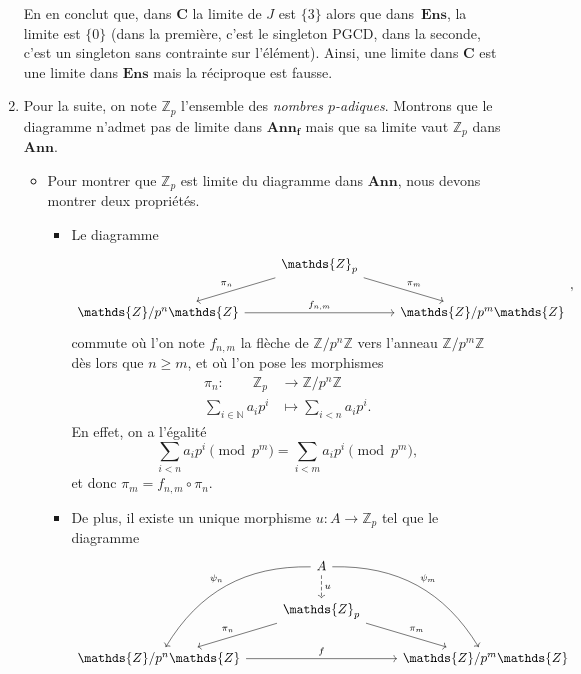 \documentclass{../../td}
\begin{document}
\begin{enumerate}
      En en conclut que, dans $\mathbf{C}$ la limite de $J$ est $\{3\} $ alors que dans~$\mathbf{Ens}$, la limite est $\{0\}$ (dans la première, c'est le singleton PGCD, dans la seconde, c'est un singleton sans contrainte sur l'élément).
      Ainsi, une limite dans $\mathbf{C}$ est une limite dans $\mathbf{Ens}$ mais la réciproque est fausse.
    \item Pour la suite, on note $\mathds{Z}_p$ l'ensemble des \textit{nombres $p$-adiques}.
      Montrons que le diagramme n'admet pas de limite dans $\mathbf{Ann_f}$ mais que sa limite vaut $\mathds{Z}_p$ dans $\mathbf{Ann}$.
      \begin{itemize}
        \item Pour montrer que $\mathds{Z}_p$ est limite du diagramme dans $\mathbf{Ann}$, nous devons montrer deux propriétés.
          \begin{itemize}
            \item Le diagramme \[
                \begin{tikzcd}
                  & \mathds{Z}_p \arrow{dr}{\pi_m} \arrow[swap]{dl}{\pi_n}\\
                  \mathds{Z}/p^n\mathds{Z} \arrow{rr}{f_{n,m}} && \mathds{Z}/p^m\mathds{Z}
                \end{tikzcd}
              ,\]
              commute où l'on note $f_{n,m}$ la flèche de $\mathds{Z} / p^n \mathds{Z}$ vers l'anneau $\mathds{Z} / p^m \mathds{Z}$ dès lors que $n \ge m$, et où l'on pose les morphismes
              \begin{align*}
                \pi_n: \quad\quad\mathds{Z}_p &\longrightarrow \mathds{Z}/p^n\mathds{Z} \\
                \sum_{i \in \mathds{N}} a_i p^i &\longmapsto \sum_{i < n} a_i p^i
              .\end{align*}
              En effet, on a l'égalité \[
                \sum_{i < n} a_i p^i \pmod{p^m} = \sum_{i < m} a_i p^i \pmod{p^m}
              ,\] et donc $\pi_m = f_{n,m}\circ\pi_n$.
            \item De plus, il existe un unique morphisme $u : A \to \mathds{Z}_p$ tel que le diagramme \[
              \begin{tikzcd}
                & A \arrow[bend left]{ddr}{\psi_m} \arrow[swap,bend right]{ddl}{\psi_n} \arrow[dashed]{d}{u}\\
                & \mathds{Z}_p  \arrow{dr}{\pi_m} \arrow[swap]{dl}{\pi_n}\\
                \mathds{Z}/p^n \mathds{Z} \arrow{rr}{f} && \mathds{Z}/p^m \mathds{Z}

\end{tikzcd}\]
\end{itemize}
\end{itemize}
\end{enumerate}
\end{document}
